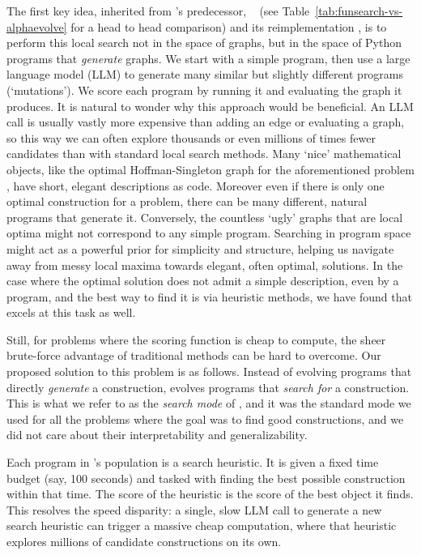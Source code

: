 The first key idea, inherited from \AlphaEvolve's predecessor, \FunSearch~\cite{romeraparedes2023mathematical} (see Table~\ref{tab:funsearch-vs-alphaevolve} for a head to head comparison) and its reimplementation \cite{ellenberg2025generative},
is to perform this local search not in the space of graphs, but in the space of Python programs that \textit{generate} graphs. We start with a simple program, then use a large language model (LLM) to generate many similar but slightly different programs (`mutations'). We score each program by running it and evaluating the graph it produces. It is natural to wonder why this approach would be beneficial. An LLM call is usually vastly more expensive than adding an edge or evaluating a graph, so this way we can often explore thousands or even millions of times fewer candidates than with standard local search methods. Many `nice' mathematical objects, like the optimal Hoffman-Singleton graph for the aforementioned problem \cite{goedgebeur2025improved}, have short, elegant descriptions as code. Moreover even if there is only one optimal construction for a problem, there can be many different, natural programs that generate it. Conversely, the countless `ugly' graphs that are local optima might not correspond to any simple program. Searching in program space might act as a powerful prior for simplicity and structure, helping us navigate away from messy local maxima towards elegant, often optimal, solutions. In the case where the optimal solution does not admit a simple description, even by a program, and the best way to find it is via heuristic methods, we have found that \AlphaEvolve excels at this task as well. 

Still, for problems where the scoring function is cheap to compute, the sheer brute-force advantage of traditional methods can be hard to overcome. Our proposed solution to this problem is as follows. Instead of evolving programs that directly \textit{generate} a construction, \AlphaEvolve evolves programs that \textit{search for} a construction. This is what we refer to as the \emph{search mode} of \AlphaEvolve, and it was the standard mode we used for all the problems where the goal was to find good constructions, and we did not care about their interpretability and generalizability.

Each program in \AlphaEvolve's population is a search heuristic. It is given a fixed time budget (say, 100 seconds) and tasked with finding the best possible construction within that time. The score of the heuristic is the score of the best object it finds. This resolves the speed disparity: a single, slow LLM call to generate a new search heuristic can trigger a massive cheap computation, where that heuristic explores millions of candidate constructions on its own.

